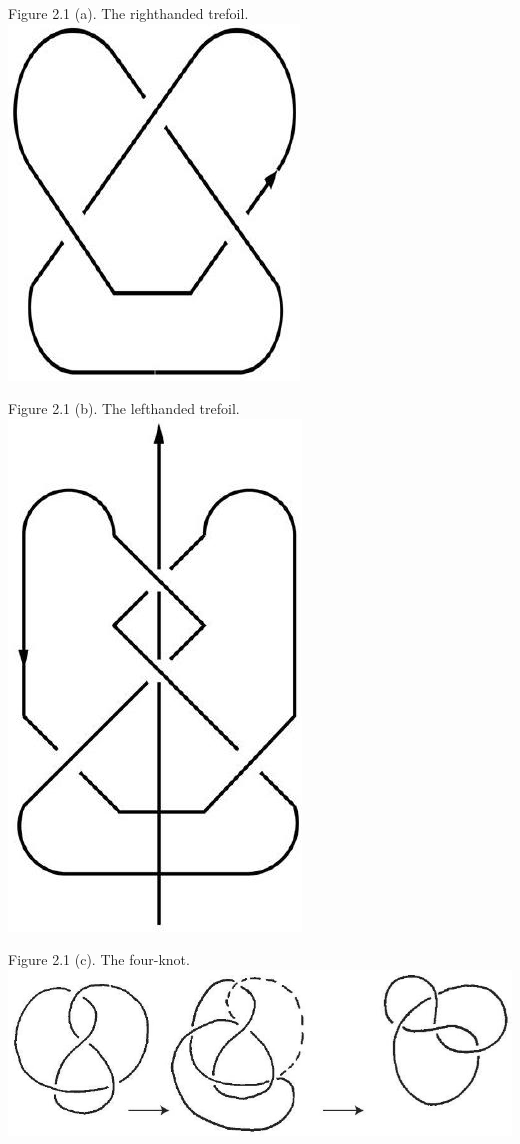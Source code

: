 \documentclass[10pt, letterpaper]{article}
\begin{document}
Figure 2.1 (a). The righthanded trefoil.\\
\includegraphics[scale=0.2, center]{2025_05_21_9c06be8de7a55410f8c1g-030(2)}

Figure 2.1 (b). The lefthanded trefoil.\\
\includegraphics[scale=0.2, center]{2025_05_21_9c06be8de7a55410f8c1g-030(1)}

Figure 2.1 (c). The four-knot.\\
\includegraphics[scale=0.2, center]{2025_05_21_9c06be8de7a55410f8c1g-031(1)}
\end{document}
